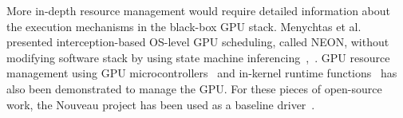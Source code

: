 More in-depth resource management would require detailed information about the execution mechanisms in the black-box GPU stack. Menychtas et al. presented interception-based OS-level GPU scheduling, called NEON, without modifying software stack by using state machine inferencing~\cite{menychtas2013enabling},~\cite{neon}. 
GPU resource management using GPU microcontrollers~\cite{fujii:apsys2013} and in-kernel runtime functions~\cite{kato:gdev} has also been demonstrated to manage the GPU.
For these pieces of open-source work, the Nouveau project has been used as a baseline driver~\cite{nouveau}.
